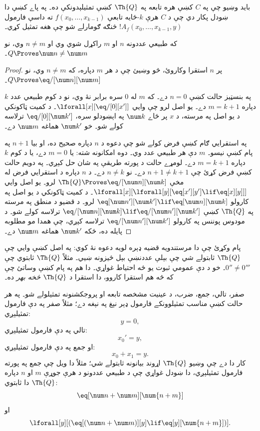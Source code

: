 \documentclass[../../../include/open-logic-section]{subfiles}
\begin{document}

بايد وښيو چې په $C$ کښې هره تابعه په $\Th{Q}$ کښې تمثيلېدونکې ده۔ په پاے کښې دا ښودل پکار دي چې د $C$ هرې $k$-ځايه تابعې $f(x_0,\dots,x_{k-1})$ ته داسې فارمول $!A_f(x_0,\dots,x_{k-1},y)$ څنګه ګومارلے شو چې هغه تمثيل کړي۔

\begin{lem}
که طبيعي عددونه $n$ او $m$ راکړل شوي وي او $n \neq m$ وي، نو $Q \Proves \num n \neq \num m$۔
\end{lem}

\begin{proof}
پر $n$ استقرا وکاروئ، څو وښيئ چې د هر $m$ دپاره، که $n \neq m$ وي، نو $Q \Proves \eq/[\num n][\num m]$۔

په بنسټيز حالت کښې $n = 0$ دے۔ که $m$ له $0$ سره برابر نۀ وي، نو د کوم طبيعي عدد $k$ دپاره $m = k + 1$ دے۔ يو اصل لرو چې وايي $\lforall[x][\eq/[0][x']]$۔ د کمیت ټاکونکي د يو اصل په مرسته، د $x$ پر ځاے $\num k$ په اېښودلو سره، $\eq/[0][\num k']$ ترلاسه کولے شو۔ خو $\num k'$ هماغه $\num m$ دے۔

په استقرايي ګام کښې فرض کولے شو چې دعوه د $n$ دپاره صحيح ده، او بيا $n+1$ په پام کښې نيسو۔ $m$ دې هر طبيعي عدد وي۔ دوه امکانونه شته: يا $m = 0$ دے، يا د کوم $k$ دپاره $m = k+1$ دے۔ لومړے حالت د پورته طريقې په شان حل کېږي۔ په دويم حالت کښې فرض کړئ چې $n+1 \neq k+1$ دے۔ نو $n \neq k$ دے۔ د $n$ دپاره د استقرايي فرض له مخې $\Th{Q} \Proves \eq/[\num n][\num k]$ لرو۔ يو اصل وايي $\lforall[x][\lforall[y][\eq[x'][y'] \lif \eq[x][y]]]$۔ د کمیت ټاکونکي د يو اصل په کارولو $\eq[\num n'][\num k'] \lif \eq[\num n][\num k]$ لرو۔ د قضيو د منطق په مرسته په $\Th{Q}$ کښې $\eq/[\num n][\num k] \lif \eq/[\num n'][\num k']$ ترلاسه کولے شو۔ د مودوس پوننس په کارولو $\eq/[\num n'][\num k']$ ترلاسه کېږي، چې همدا مو مطلوبه پايله ده، ځکه $\num k'$ هماغه $\num m$ دے۔
\end{proof}

پام وکړئ چې دا مرستندويه قضيه ډېره لويه دعوه نۀ کوي: په اصل کښې وايي چې $\Th{Q}$ ثابتولے شي چې بېلې عددنښې بېل څيزونه ښيي۔ مثلاً $\Th{Q}$ ثابتوي چې $0'' \neq 0'''$۔ خو د دې عمومي ثبوت يو څه احتياط غواړي۔ دا هم په پام کښې وساتئ چې که څه هم استقرا کاروو، دا استقرا د $\Th{Q}$ \emph{څخه بهر} ده۔

صفر، تالي، جمع، ضرب، د عينيت مشخصه تابعه او پروجکشنونه تمثيلولے شو۔ په هر حالت کښې مناسب تمثيلوونکے فارمول ډېر نېغ په نېغه دے؛ مثلاً صفر په دې فارمول تمثيلېږي:
\[
y = 0,
\]
تالي په دې فارمول تمثيلېږي:
\[
x_0' = y,
\]
او جمع په دې فارمول تمثيلېږي:
\[
x_0 + x_1 = y.
\]
کار دا دے چې وښيو $\Th{Q}$ اړوند بيانونه ثابتولے شي؛ مثلاً دا ويل چې جمع په پورته فارمول تمثيلېږي، دا ښودل غواړي چې د طبيعي عددونو د هرې جوړې $m$ او $n$ دپاره $\Th{Q}$ دا ثابتوي:
\[
\eq[\num n + \num m][\num {n+m}]
\]
او
\[
\lforall[y][(\eq[(\num n + \num m)][y] \lif \eq[y][\num {n+m}])].
\]
\end{document}
